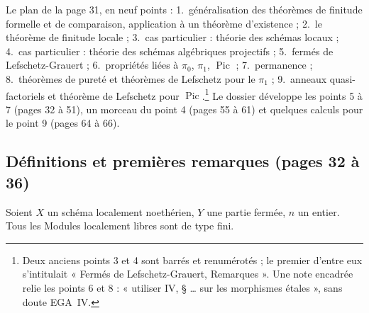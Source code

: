 \documentclass[11pt,a4paper]{article}
\begin{document}
Le plan de la page 31, en neuf points : 1.~généralisation des théorèmes de
finitude formelle et de comparaison, application à un théorème d'existence ;
2.~le théorème de finitude locale ; 3.~cas particulier : théorie des schémas
locaux ; 4.~cas particulier : théorie des schémas algébriques projectifs ; 5.~fermés de Lefschetz-Grauert ;
6.~propriétés liées à $\pi_0$, $\pi_1$, $\operatorname{Pic}$ ;
7.~permanence ; 8.~théorèmes de pureté et théorèmes de Lefschetz pour le
$\pi_1$ ; 9.~anneaux quasi-factoriels et théorème de Lefschetz pour
$\operatorname{Pic}$.\footnote{Deux anciens points 3 et 4 sont barrés et
renumérotés ; le premier d'entre eux s'intitulait « Fermés de
Lefschetz-Grauert, Remarques ». Une note encadrée relie les points 6 et 8 : « utiliser IV, § …
sur les morphismes étales », sans doute EGA~IV.} Le dossier développe les
points 5 à 7 (pages 32 à 51), un morceau du point 4 (pages 55 à 61) et
quelques calculs pour le point 9 (pages 64 à 66).

\subsection*{Définitions et premières remarques (pages 32 à 36)}

Soient $X$ un schéma localement noethérien, $Y$ une partie fermée, $n$ un
entier. Tous les Modules localement libres sont de type fini.
\end{document}
